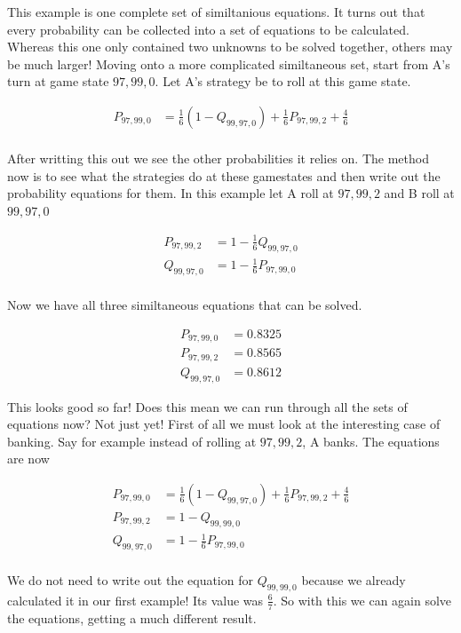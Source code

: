 \documentclass[a4paper,titlepage]{article}
\begin{document}
This example is one complete set of similtanious equations. It turns out that every probability can be collected into a set of equations to be calculated.
Whereas this one only contained two unknowns to be solved together, others may be much larger!
Moving onto a more complicated similtaneous set, start from A's turn at game state $97,99,0$. Let A's strategy be to roll at this game state.

\begin{align*}
	P_{97,99,0} &= \frac{1}{6}(1 - Q_{99,97,0})+\frac{1}{6}P_{97,99,2}+\frac{4}{6}\\
\end{align*}

After writting this out we see the other probabilities it relies on. The method now is to see what the strategies do at these gamestates and then write out the probability equations for them.
In this example let A roll at $97,99,2$ and B roll at $99,97,0$

\begin{align*}
	P_{97,99,2} &= 1 - \frac{1}{6}Q_{99,97,0}\\
	Q_{99,97,0} &= 1 - \frac{1}{6}P_{97,99,0}\\
\end{align*}

Now we have all three similtaneous equations that can be solved.

\begin{align*}
	P_{97,99,0} &= 0.8325\\
	P_{97,99,2} &= 0.8565\\
	Q_{99,97,0} &= 0.8612
\end{align*}

This looks good so far! Does this mean we can run through all the sets of equations now?
Not just yet! First of all we must look at the interesting case of banking. Say for example instead of rolling at $97,99,2$, A banks.
The equations are now

\begin{align*}
	P_{97,99,0} &= \frac{1}{6}(1 - Q_{99,97,0})+\frac{1}{6}P_{97,99,2}+\frac{4}{6}\\
	P_{97,99,2} &= 1 - Q_{99,99,0}\\
	Q_{99,97,0} &= 1 - \frac{1}{6}P_{97,99,0}\\
\end{align*}

We do not need to write out the equation for $Q_{99,99,0}$ because we already calculated it in our first example! Its value was $\frac{6}{7}$.
So with this we can again solve the equations, getting a much different result.
\end{document}

